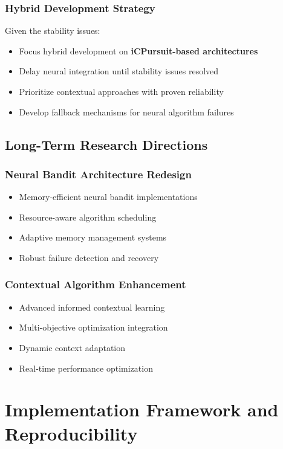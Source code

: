 \documentclass[12pt,a4paper]{article}
\newcommand{\success}[1]{\textcolor{successcolor}{\textbf{#1}}}
\begin{document}
\subsubsection{Hybrid Development Strategy}
Given the stability issues:
\begin{itemize}
\item Focus hybrid development on \success{iCPursuit-based architectures}
\item Delay neural integration until stability issues resolved
\item Prioritize contextual approaches with proven reliability
\item Develop fallback mechanisms for neural algorithm failures
\end{itemize}

\subsection{Long-Term Research Directions}

\subsubsection{Neural Bandit Architecture Redesign}
\begin{itemize}
\item Memory-efficient neural bandit implementations
\item Resource-aware algorithm scheduling
\item Adaptive memory management systems
\item Robust failure detection and recovery
\end{itemize}

\subsubsection{Contextual Algorithm Enhancement}
\begin{itemize}
\item Advanced informed contextual learning
\item Multi-objective optimization integration
\item Dynamic context adaptation
\item Real-time performance optimization
\end{itemize}

\section{Implementation Framework and Reproducibility}
\end{document}
